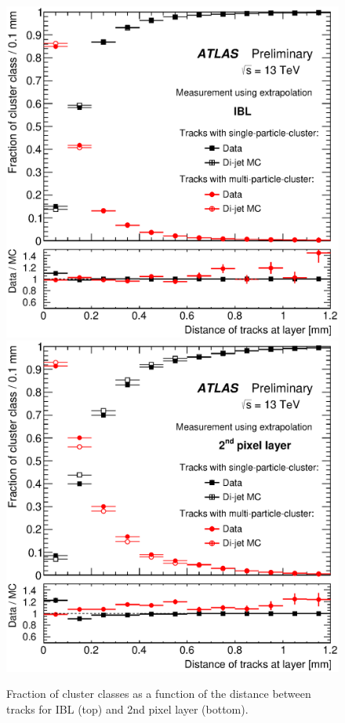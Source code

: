\begin{centering}
\begin{figure}[!htb]
\myfloatalign
\includegraphics[width=.9\linewidth]{figures/nn/fig_07a.eps}
\includegraphics[width=.9\linewidth]{figures/nn/fig_07b.eps}
\caption{Fraction of cluster classes as a function of the distance between tracks for IBL (top) and 2nd pixel layer (bottom).}
\label{fig:13tev_fractions}
\end{figure}
\end{centering}



